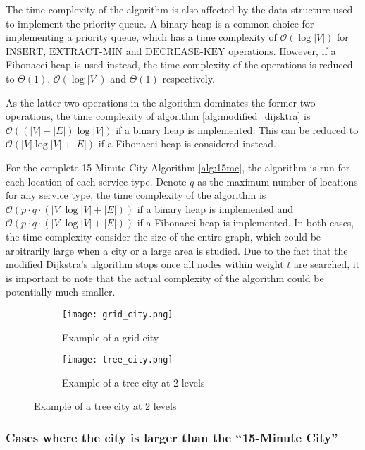 The time complexity of the algorithm is also affected by the data structure used to implement the priority queue. A binary heap is a common choice for implementing a priority queue, which has a time complexity of $\mathcal{O}(\log |V|)$ for $\text{INSERT}$, $\text{EXTRACT-MIN}$ and $\text{DECREASE-KEY}$ operations. However, if a Fibonacci heap is used instead, the time complexity of the operations is reduced to $\Theta(1)$, $\mathcal{O}(\log |V|)$ and $\Theta(1)$ respectively.

As the latter two operations in the algorithm dominates the former two operations, the time complexity of algorithm \ref{alg:modified_dijsktra} is $\mathcal{O}((|V|+|E|)\log |V|)$ if a binary heap is implemented. This can be reduced to $\mathcal{O}(|V|\log |V|+|E|)$ if a Fibonacci heap is considered instead.

For the complete 15-Minute City Algorithm \ref{alg:15mc}, the algorithm is run for each location of each service type. Denote $q$ as the maximum number of locations for any service type, the time complexity of the algorithm is $\mathcal{O}(p\cdot q\cdot(|V|\log |V|+|E|))$ if a binary heap is implemented and $\mathcal{O}(p\cdot q\cdot(|V|\log |V|+|E|))$ if a Fibonacci heap is implemented. In both cases, the time complexity consider the size of the entire graph, which could be arbitrarily large when a city or a large area is studied. Due to the fact that the modified Dijkstra's algorithm stops once all nodes within weight $t$ are searched, it is important to note that the actual complexity of the algorithm could be potentially much smaller.

\begin{figure}[H]
    \centering
    \begin{subfigure}{0.5\textwidth}
        \centering
        \texttt{[image: grid\_city.png]}
        \caption{Example of a grid city}
        \label{fig:grid_city}
    \end{subfigure}\hfill
    \begin{subfigure}{0.5\textwidth}
        \centering
        \texttt{[image: tree\_city.png]}
        \caption{Example of a tree city at 2 levels}
        \label{fig:tree_city}
    \end{subfigure}
\end{figure}

\subsubsection{Cases where the city is larger than the ``15-Minute City''}

